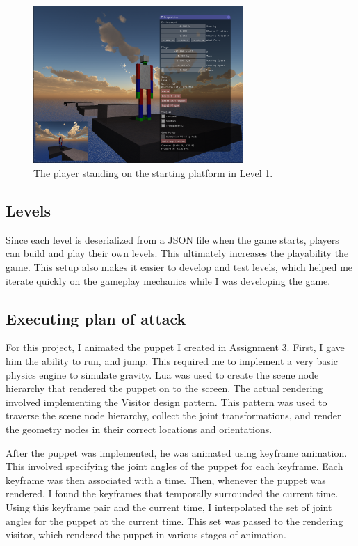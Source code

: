 \documentclass[11pt]{report}
\begin{document}
\begin{figure}[H]
\includegraphics[width=8cm]{start.png}
\centering
\caption{The player standing on the starting platform in Level 1.}
\end{figure}

\subsection{Levels}
Since each level is deserialized from a JSON file when the game starts, players can build and play their own levels. This ultimately increases the playability the game. This setup also makes it easier to develop and test levels, which helped me iterate quickly on the gameplay mechanics while I was developing the game.

\subsection{Executing plan of attack}
For this project, I animated the puppet I created in Assignment 3. First, I gave him the ability to run, and jump. This required me to implement a very basic physics engine to simulate gravity. Lua was used to create the scene node hierarchy that rendered the puppet on to the screen. The actual rendering involved implementing the Visitor design pattern. This pattern was used to traverse the scene node hierarchy, collect the joint transformations, and render the geometry nodes in their correct locations and orientations.

After the puppet was implemented, he was animated using keyframe animation. This involved specifying the joint angles of the puppet for each keyframe. Each keyframe was then associated with a time. Then, whenever the puppet was rendered, I found the keyframes that temporally surrounded the current time. Using this keyframe pair and the current time, I interpolated the set of joint angles for the puppet at the current time. This set was passed to the rendering visitor, which rendered the puppet in various stages of animation.
\end{document}
